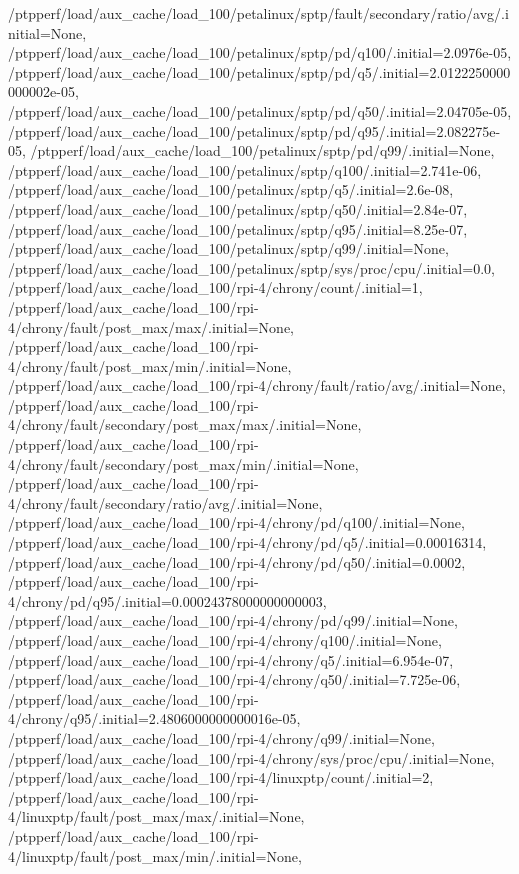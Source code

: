 {    /ptpperf/load/aux_cache/load_100/petalinux/sptp/fault/secondary/ratio/avg/.initial=None,
    /ptpperf/load/aux_cache/load_100/petalinux/sptp/pd/q100/.initial=2.0976e-05,
    /ptpperf/load/aux_cache/load_100/petalinux/sptp/pd/q5/.initial=2.0122250000000002e-05,
    /ptpperf/load/aux_cache/load_100/petalinux/sptp/pd/q50/.initial=2.04705e-05,
    /ptpperf/load/aux_cache/load_100/petalinux/sptp/pd/q95/.initial=2.082275e-05,
    /ptpperf/load/aux_cache/load_100/petalinux/sptp/pd/q99/.initial=None,
    /ptpperf/load/aux_cache/load_100/petalinux/sptp/q100/.initial=2.741e-06,
    /ptpperf/load/aux_cache/load_100/petalinux/sptp/q5/.initial=2.6e-08,
    /ptpperf/load/aux_cache/load_100/petalinux/sptp/q50/.initial=2.84e-07,
    /ptpperf/load/aux_cache/load_100/petalinux/sptp/q95/.initial=8.25e-07,
    /ptpperf/load/aux_cache/load_100/petalinux/sptp/q99/.initial=None,
    /ptpperf/load/aux_cache/load_100/petalinux/sptp/sys/proc/cpu/.initial=0.0,
    /ptpperf/load/aux_cache/load_100/rpi-4/chrony/count/.initial=1,
    /ptpperf/load/aux_cache/load_100/rpi-4/chrony/fault/post_max/max/.initial=None,
    /ptpperf/load/aux_cache/load_100/rpi-4/chrony/fault/post_max/min/.initial=None,
    /ptpperf/load/aux_cache/load_100/rpi-4/chrony/fault/ratio/avg/.initial=None,
    /ptpperf/load/aux_cache/load_100/rpi-4/chrony/fault/secondary/post_max/max/.initial=None,
    /ptpperf/load/aux_cache/load_100/rpi-4/chrony/fault/secondary/post_max/min/.initial=None,
    /ptpperf/load/aux_cache/load_100/rpi-4/chrony/fault/secondary/ratio/avg/.initial=None,
    /ptpperf/load/aux_cache/load_100/rpi-4/chrony/pd/q100/.initial=None,
    /ptpperf/load/aux_cache/load_100/rpi-4/chrony/pd/q5/.initial=0.00016314,
    /ptpperf/load/aux_cache/load_100/rpi-4/chrony/pd/q50/.initial=0.0002,
    /ptpperf/load/aux_cache/load_100/rpi-4/chrony/pd/q95/.initial=0.00024378000000000003,
    /ptpperf/load/aux_cache/load_100/rpi-4/chrony/pd/q99/.initial=None,
    /ptpperf/load/aux_cache/load_100/rpi-4/chrony/q100/.initial=None,
    /ptpperf/load/aux_cache/load_100/rpi-4/chrony/q5/.initial=6.954e-07,
    /ptpperf/load/aux_cache/load_100/rpi-4/chrony/q50/.initial=7.725e-06,
    /ptpperf/load/aux_cache/load_100/rpi-4/chrony/q95/.initial=2.4806000000000016e-05,
    /ptpperf/load/aux_cache/load_100/rpi-4/chrony/q99/.initial=None,
    /ptpperf/load/aux_cache/load_100/rpi-4/chrony/sys/proc/cpu/.initial=None,
    /ptpperf/load/aux_cache/load_100/rpi-4/linuxptp/count/.initial=2,
    /ptpperf/load/aux_cache/load_100/rpi-4/linuxptp/fault/post_max/max/.initial=None,
    /ptpperf/load/aux_cache/load_100/rpi-4/linuxptp/fault/post_max/min/.initial=None,
}
